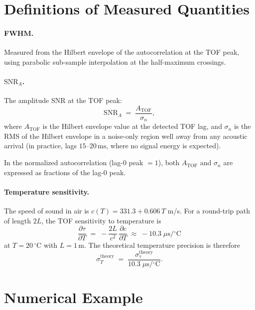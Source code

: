 \documentclass[11pt]{article}
\begin{document}
\section{Definitions of Measured Quantities}

\paragraph{FWHM.}
Measured from the Hilbert envelope of the autocorrelation at the TOF peak,
using parabolic sub-sample interpolation at the half-maximum crossings.

\paragraph{$\mathrm{SNR}_A$.}
The amplitude SNR at the TOF peak:
\begin{equation}
  \mathrm{SNR}_A \;=\; \frac{A_\mathrm{TOF}}{\sigma_n},
\end{equation}
where $A_\mathrm{TOF}$ is the Hilbert envelope value at the detected TOF lag, and
$\sigma_n$ is the RMS of the Hilbert envelope in a noise-only region well away from
any acoustic arrival (in practice, lags $15$--$20\,\mathrm{ms}$, where no signal energy
is expected).

In the normalized autocorrelation (lag-0 peak $= 1$), both $A_\mathrm{TOF}$ and
$\sigma_n$ are expressed as fractions of the lag-0 peak.

\paragraph{Temperature sensitivity.}
The speed of sound in air is $c(T) = 331.3 + 0.606\,T$ m/s.  For a round-trip path
of length $2L$, the TOF sensitivity to temperature is
\begin{equation}
  \frac{\partial \tau}{\partial T}
    \;=\; -\frac{2L}{c^2}\,\frac{\partial c}{\partial T}
    \;\approx\; -10.3\;\mu\mathrm{s/{}^\circ C}
\end{equation}
at $T = 20\,^\circ$C with $L = 1\,\mathrm{m}$.  The theoretical temperature precision is
therefore
\begin{equation}
  \sigma_T^{\mathrm{theory}}
    \;=\; \frac{\sigma_\tau^{\mathrm{theory}}}{10.3\;\mu\mathrm{s/{}^\circ C}}.
\end{equation}

\section{Numerical Example}
\end{document}
